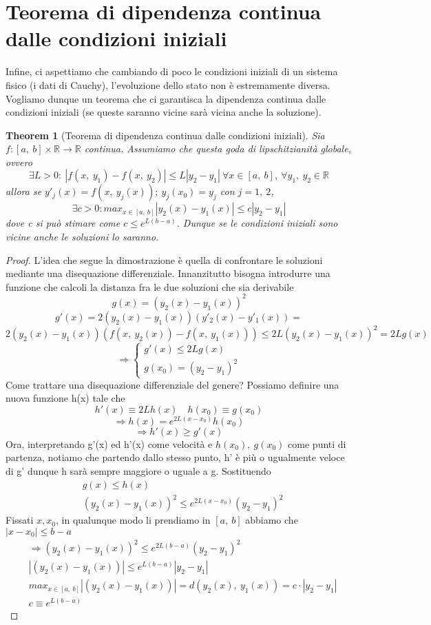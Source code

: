\documentclass[10pt,a4paper]{article}
\newtheorem{theorem}{Theorem}
\newtheorem{proof}{Proof}
\begin{document}
\section{Teorema di dipendenza continua dalle condizioni iniziali}
Infine, ci aspettiamo che cambiando di poco le condizioni iniziali di un sistema fisico (i dati di Cauchy), l'evoluzione dello stato non è estremamente diversa. Vogliamo dunque un teorema che ci garantisca la dipendenza continua dalle condizioni iniziali (se queste saranno vicine sarà vicina anche la soluzione).\\
\begin{theorem}[Teorema di dipendenza continua dalle condizioni iniziali]
	Sia \(f:[a,\ b]\times \mathbb{R}\to \mathbb{R}\) continua. Assumiamo che questa goda di lipschitzianità globale, ovvero
	\[\exists L>0:\ |f(x,\ y_1)-f(x,\ y_2)|\leq L |y_2-y_1|\ \forall x\in[a,\ b],\ \forall y_1,\ y_2 \in \mathbb{R}\]
	allora se \(y'_j(x)=f(x,\ y_j(x));\ y_j(x_0)=y_j\) con \(j=1,\ 2\), 
	\[\exists c>0:max_{x\in[a,\ b]}|y_2(x)-y_1(x)|\leq c|y_2-y_1|\]
	dove c si può stimare come $c\leq e^{L(b-a)}$. 
	Dunque se le condizioni iniziali sono vicine anche le soluzioni lo saranno. 
\end{theorem}
\begin{proof}
	L'idea che segue la dimostrazione è quella di confrontare le soluzioni mediante una disequazione differenziale. Innanzitutto bisogna introdurre una funzione che calcoli la distanza fra le due soluzioni che sia derivabile
	\[g(x)=(y_2(x)-y_1(x))^2\]
	\[g'(x)=2(y_2(x)-y_1(x))(y'_2(x)-y'_1(x))=\]
	\[2(y_2(x)-y_1(x))(f(x,\ y_2(x))-f(x,\ y_1(x)))\leq 2L(y_2(x)-y_1(x))^2=2Lg(x)\]
	\[\Rightarrow 
	\begin{cases}
		g'(x)\leq 2Lg(x)\\
		g(x_0)=(y_2-y_1)^2
	\end{cases}\]
	Come trattare una disequazione differenziale del genere? Possiamo definire una nuova funzione h(x) tale che
	\[h'(x)\equiv 2Lh(x) \quad h(x_0)\equiv g(x_0)\]
	\[\Rightarrow h(x)=e^{2L(x-x_0)}h(x_0)\] 
	\[\Rightarrow h'(x)\geq g'(x)\]
	Ora, interpretando g'(x) ed h'(x) come velocità e \(h(x_0),\ g(x_0)\) come punti di partenza, notiamo che partendo dallo stesso punto, h' è più o ugualmente veloce di g' dunque h sarà sempre maggiore o uguale a g. Sostituendo
	\begin{align*}
		&g(x)\leq h(x)\\
		&(y_2(x)-y_1(x))^2 \leq e^{2L(x-x_0)}(y_2-y_1)^2
	\end{align*}
	Fissati \(x, x_0\), in qualunque modo li prendiamo in \([a,\ b]\) abbiamo che \(|x-x_0|\leq b-a\)
	\begin{align*}
		&\Rightarrow (y_2(x)-y_1(x))^2 \leq e^{2L(b-a)}(y_2-y_1)^2\\
		&|(y_2(x)-y_1(x))|\leq e^{L(b-a)}|y_2-y_1|\\
		&max_{x\in[a,\ b]}|(y_2(x)-y_1(x))|=d(y_2(x),\ y_1(x))= c\cdot |y_2-y_1| \\
		&c\equiv e^{L(b-a)}
	\end{align*}
\end{proof}
\end{document}
